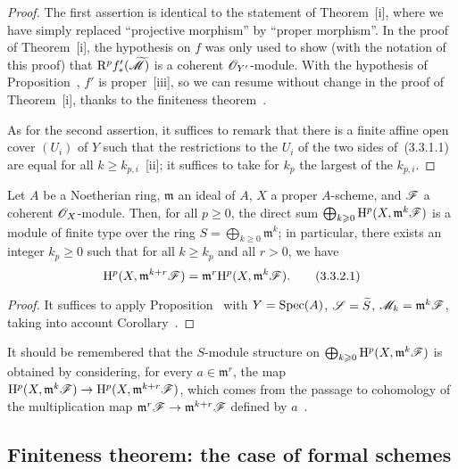 \begin{proof}
The first assertion is identical to the statement of Theorem~[i], where we have simply replaced ``projective morphism'' by ``proper morphism''.
In the proof of Theorem~[i], the hypothesis on $f$ was only used to show (with the notation of this proof) that $\mathrm{R}^p f_*'(\widetilde{\mathscr{M}})$ is a coherent $\mathscr{O}_{Y'}$-module.
With the hypothesis of Proposition~, $f'$ is proper~[iii], so we can resume without change in the proof of Theorem~[i], thanks to the finiteness theorem~.

As for the second assertion, it suffices to remark that there is a finite affine open cover $(U_i)$ of $Y$ such that the restrictions to the $U_i$ of the two sides of~(3.3.1.1) are equal for all $k\geq k_{p,i}$~[ii]; it suffices to take for $k_p$ the largest of the $k_{p,i}$.
\end{proof}

\begin{corollary}[3.3.2]
\label{III.3.3.2}
Let $A$ be a Noetherian ring, $\mathfrak{m}$ an ideal of $A$, $X$ a proper $A$-scheme, and $\mathscr{F}$ a coherent $\mathscr{O}_X$-module.
Then, for all $p\geq 0$, the direct sum $\bigoplus_{k\geqslant 0}\mathrm{H}^p(X,\mathfrak{m}^k\mathscr{F})$ is a module of finite type over the ring $S=\bigoplus_{k\geq 0}\mathfrak{m}^k$; in particular, there exists an integer $k_p\geq 0$ such that for all $k\geq k_p$ and all $r>0$, we have
\[
\label{III.3.3.2.1}
  \mathrm{H}^p(X,\mathfrak{m}^{k+r}\mathscr{F})=\mathfrak{m}^r\mathrm{H}^p(X,\mathfrak{m}^k\mathscr{F}).
  \tag{3.3.2.1}
\]
\end{corollary}

\begin{proof}
It suffices to apply Proposition~ with $Y=\operatorname{Spec}(A)$, $\mathscr{S}=\widetilde{S}$, $\mathscr{M}_k=\mathfrak{m}^k\mathscr{F}$, taking into account Corollary~.
\end{proof}

It should be remembered that the $S$-module structure on $\bigoplus_{k\geqslant 0}\mathrm{H}^p(X,\mathfrak{m}^k\mathscr{F})$ is obtained by considering, for every $a\in\mathfrak{m}^r$, the map $\HH^p(X,\mathfrak{m}^k\sh{F})\to\HH^p(X,\mathfrak{m}^{k+r}\sh{F})$, which comes from the passage to cohomology of the multiplication map $\mathfrak{m}^r\sh{F}\to\mathfrak{m}^{k+r}\sh{F}$ defined by $a$~.

\subsection{Finiteness theorem: the case of formal schemes}
\label{subsection:III.3.4}


